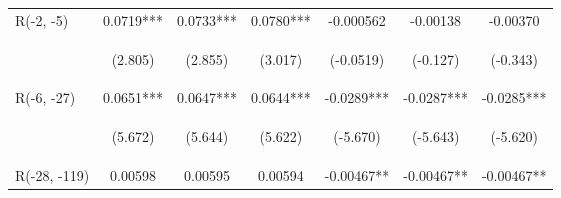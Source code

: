 \documentclass[border=0.2cm]{standalone}
\begin{document}
\begin{tabular}{lcccccc}
    R(-2, -5)              & 0.0719***                                      & 0.0733***                                      & 0.0780***                                      & -0.000562                                       & -0.00138                                       & -0.00370                                       \\
    \vspace{4pt}           & \begin{footnotesize}(2.805)\end{footnotesize}  & \begin{footnotesize}(2.855)\end{footnotesize}  & \begin{footnotesize}(3.017)\end{footnotesize}  & \begin{footnotesize}(-0.0519)\end{footnotesize} & \begin{footnotesize}(-0.127)\end{footnotesize} & \begin{footnotesize}(-0.343)\end{footnotesize} \\
    R(-6, -27)             & 0.0651***                                      & 0.0647***                                      & 0.0644***                                      & -0.0289***                                      & -0.0287***                                     & -0.0285***                                     \\
    \vspace{4pt}           & \begin{footnotesize}(5.672)\end{footnotesize}  & \begin{footnotesize}(5.644)\end{footnotesize}  & \begin{footnotesize}(5.622)\end{footnotesize}  & \begin{footnotesize}(-5.670)\end{footnotesize}  & \begin{footnotesize}(-5.643)\end{footnotesize} & \begin{footnotesize}(-5.620)\end{footnotesize} \\
    R(-28, -119)           & 0.00598                                        & 0.00595                                        & 0.00594                                        & -0.00467**                                      & -0.00467**                                     & -0.00467**                                     \\

\end{tabular}
\end{document}
